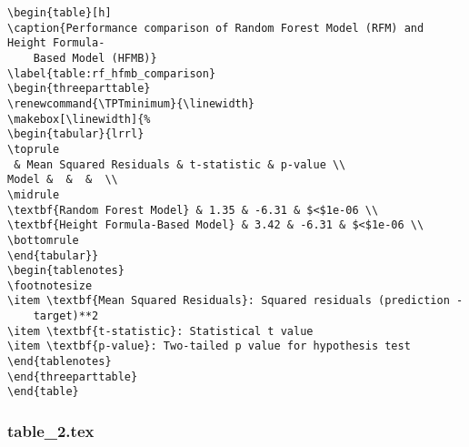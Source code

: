\documentclass[11pt]{article}
\begin{document}
\begin{Verbatim}[tabsize=4]
\begin{table}[h]
\caption{Performance comparison of Random Forest Model (RFM) and Height Formula-
	Based Model (HFMB)}
\label{table:rf_hfmb_comparison}
\begin{threeparttable}
\renewcommand{\TPTminimum}{\linewidth}
\makebox[\linewidth]{%
\begin{tabular}{lrrl}
\toprule
 & Mean Squared Residuals & t-statistic & p-value \\
Model &  &  &  \\
\midrule
\textbf{Random Forest Model} & 1.35 & -6.31 & $<$1e-06 \\
\textbf{Height Formula-Based Model} & 3.42 & -6.31 & $<$1e-06 \\
\bottomrule
\end{tabular}}
\begin{tablenotes}
\footnotesize
\item \textbf{Mean Squared Residuals}: Squared residuals (prediction -
	target)**2
\item \textbf{t-statistic}: Statistical t value
\item \textbf{p-value}: Two-tailed p value for hypothesis test
\end{tablenotes}
\end{threeparttable}
\end{table}

\end{Verbatim}

\subsubsection*{table\_2.tex}
\end{document}
